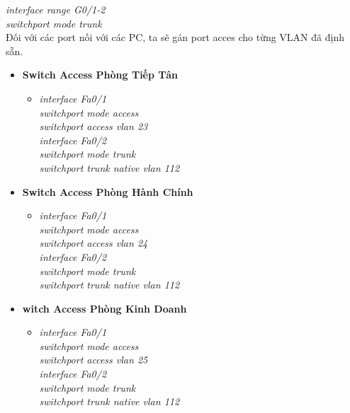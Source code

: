 \documentclass[12pt,a4paper]{report}
\begin{document}
\begin{itemize}
\hspace*{2cm}\textit{interface range G0/1-2\\
\hspace*{2cm}switchport mode trunk\\}
\hspace*{1cm}Đối với các port nối với các PC, ta sẽ gán port acces cho từng VLAN đã định sẵn.
  \begin{itemize}
    \item \textbf{Switch Access Phòng Tiếp Tân}
    \begin{itemize}
      \item \textit{interface Fa0/1\\
\hspace*{2cm}switchport mode access\\
\hspace*{2cm}switchport access vlan 23 \\
\hspace*{2cm}interface Fa0/2\\
\hspace*{2cm}switchport mode trunk\\
\hspace*{2cm}switchport trunk native vlan 112\\}   
      
    \end{itemize}
   
     \item \textbf{Switch Access Phòng Hành Chính}
     \begin{itemize}
      \item \textit{interface Fa0/1\\
\hspace*{2cm}switchport mode access\\
\hspace*{2cm}switchport access vlan 24\\
\hspace*{2cm}interface Fa0/2\\
\hspace*{2cm}switchport mode trunk\\
\hspace*{2cm}switchport trunk native vlan 112\\}
     
    \end{itemize}
     \item \textbf{witch Access Phòng Kinh Doanh}
     \begin{itemize}
      \item \textit{interface Fa0/1\\
\hspace*{2cm}switchport mode access\\
\hspace*{2cm}switchport access vlan 25\\
\hspace*{2cm}interface Fa0/2\\
\hspace*{2cm}switchport mode trunk\\
\hspace*{2cm}switchport trunk native vlan 112\\}
     

\end{itemize}
\end{itemize}
\end{itemize}
\end{document}
